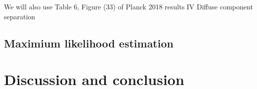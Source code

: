 \documentclass[twocolumn]{../../common/aa}
\begin{document}
We will also use Table 6, Figure (33)
of Planck 2018 results IV Diffuse component separation


\subsection{Maximium likelihood estimation}


\section{Discussion and conclusion}
\label{sec:conclusion}






%




\end{document}
